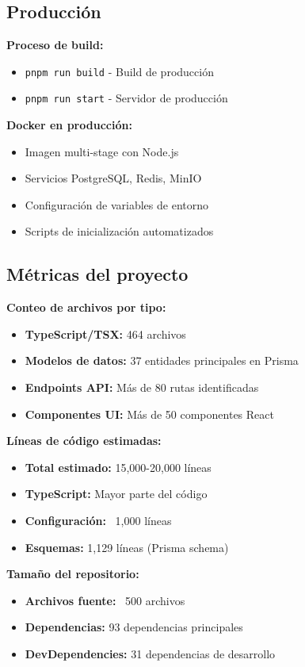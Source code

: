 \documentclass[12pt,a4paper]{article}
\begin{document}
\begin{enumerate}
\subsection{Producción}

\textbf{Proceso de build:}
\begin{itemize}
    \item \texttt{pnpm run build} - Build de producción
    \item \texttt{pnpm run start} - Servidor de producción
\end{itemize}

\textbf{Docker en producción:}
\begin{itemize}
    \item Imagen multi-stage con Node.js
    \item Servicios PostgreSQL, Redis, MinIO
    \item Configuración de variables de entorno
    \item Scripts de inicialización automatizados
\end{itemize}

\subsection{Métricas del proyecto}

\textbf{Conteo de archivos por tipo:}
\begin{itemize}
    \item \textbf{TypeScript/TSX:} 464 archivos
    \item \textbf{Modelos de datos:} 37 entidades principales en Prisma
    \item \textbf{Endpoints API:} Más de 80 rutas identificadas
    \item \textbf{Componentes UI:} Más de 50 componentes React
\end{itemize}

\textbf{Líneas de código estimadas:}
\begin{itemize}
    \item \textbf{Total estimado:} 15,000-20,000 líneas
    \item \textbf{TypeScript:} Mayor parte del código
    \item \textbf{Configuración:} ~1,000 líneas
    \item \textbf{Esquemas:} 1,129 líneas (Prisma schema)
\end{itemize}

\textbf{Tamaño del repositorio:}
\begin{itemize}
    \item \textbf{Archivos fuente:} ~500 archivos
    \item \textbf{Dependencias:} 93 dependencias principales
    \item \textbf{DevDependencies:} 31 dependencias de desarrollo
\end{itemize}


\end{enumerate}
\end{document}
